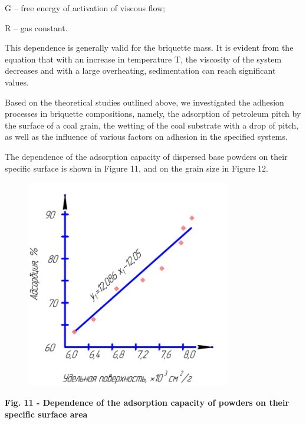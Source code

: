 G -- free energy of activation of viscous flow;

R -- gas constant.

This dependence is generally valid for the briquette mass. It is evident
from the equation that with an increase in temperature T, the viscosity
of the system decreases and with a large overheating, sedimentation can
reach significant values.

Based on the theoretical studies outlined above, we investigated the
adhesion processes in briquette compositions, namely, the adsorption of
petroleum pitch by the surface of a coal grain, the wetting of the coal
substrate with a drop of pitch, as well as the influence of various
factors on adhesion in the specified systems.

The dependence of the adsorption capacity of dispersed base powders on
their specific surface is shown in Figure 11, and on the grain size in
Figure 12.

\begin{figure}[H]
	\centering
	\includegraphics[width=0.8\textwidth]{media/gorn2/image14}
	\caption*{}
\end{figure}


{\bfseries Fig. 11 - Dependence of the adsorption capacity of powders on
their specific surface area}

